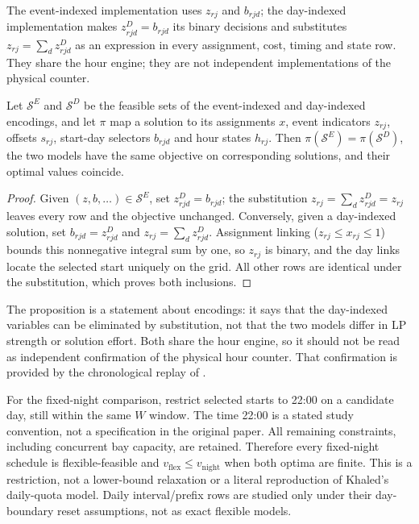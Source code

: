 The event-indexed implementation uses $z_{rj}$ and $b_{rjd}$; the
day-indexed implementation makes $z^{D}_{rjd}=b_{rjd}$ its binary decisions
and substitutes $z_{rj}=\sum_d z^{D}_{rjd}$ as an expression in every
assignment, cost, timing and state row. They share the hour engine; they are
not independent implementations of the physical counter.

\begin{proposition}
\label{prop:uniform_equivalence}
Let $\mathcal{S}^{E}$ and $\mathcal{S}^{D}$ be the feasible sets of the
event-indexed and day-indexed encodings, and let $\pi$ map a solution to its
assignments $x$, event indicators $z_{rj}$, offsets $s_{rj}$, start-day
selectors $b_{rjd}$ and hour states $h_{rj}$. Then
$\pi(\mathcal{S}^{E})=\pi(\mathcal{S}^{D})$, the two models have the same
objective on corresponding solutions, and their optimal values coincide.
\end{proposition}
\begin{proof}
Given $(z,b,\dots)\in\mathcal{S}^{E}$, set $z^{D}_{rjd}=b_{rjd}$; the
substitution $z_{rj}=\sum_d z^{D}_{rjd}=z_{rj}$ leaves every row and the
objective unchanged. Conversely, given a day-indexed solution, set
$b_{rjd}=z^{D}_{rjd}$ and $z_{rj}=\sum_d z^{D}_{rjd}$. Assignment linking
($z_{rj}\le x_{rj}\le1$) bounds this nonnegative integral sum by one, so
$z_{rj}$ is binary, and the day links locate the selected start uniquely on the
grid. All other rows are identical under the substitution, which proves both
inclusions.
\end{proof}

The proposition is a statement about encodings: it says that the day-indexed
variables can be eliminated by substitution, not that the two models differ in
LP strength or solution effort. Both share the hour engine, so it should not
be read as independent confirmation of the physical hour counter. That
confirmation is provided by the chronological replay of .

For the fixed-night comparison, restrict selected starts to 22:00 on a
candidate day, still within the same $W$ window. The time 22:00 is a stated
study convention, not a specification in the original paper. All remaining
constraints, including concurrent bay capacity, are retained. Therefore every
fixed-night schedule is flexible-feasible and
$v_{\mathrm{flex}}\le v_{\mathrm{night}}$ when both optima are finite.
This is a restriction, not a lower-bound relaxation or a literal reproduction
of Khaled's daily-quota model. Daily interval/prefix rows are studied only
under their day-boundary reset assumptions, not as exact flexible models.

